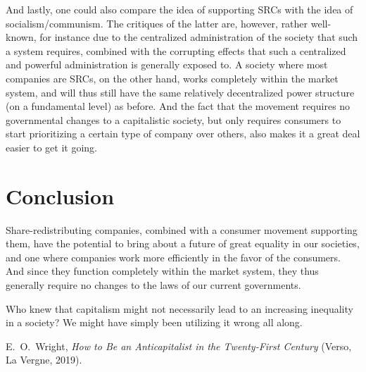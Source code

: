 \documentclass{article}
\begin{document}
And lastly, one could also compare the idea of supporting SRCs with the idea of socialism/communism. The critiques of the latter are, however, rather well-known, for instance due to the centralized administration of the society that such a system requires, combined with the corrupting effects that such a centralized and powerful administration is generally exposed to. 
A society where most companies are SRCs, on the other hand, works completely within the market system, and will thus still have the same relatively decentralized power structure (on a fundamental level) as before. And the fact that the movement requires no governmental changes to a capitalistic society, but only requires consumers to start prioritizing a certain type of company over others, also makes it a great deal easier to get it going. 




\section{Conclusion}

Share-redistributing companies, combined with a consumer movement supporting them, have the potential to bring about a future of great equality in our societies, and one where companies work more efficiently in the favor of the consumers. And since they function completely within the market system, they thus generally require no changes to the laws of our current governments. 

Who knew that capitalism might not necessarily lead to an increasing inequality in a society? We might have simply been utilizing it wrong all along.













\begin{thebibliography}{20}
	
	
	E.\ O.\ Wright, 
	\textit{ How to Be an Anticapitalist in the Twenty-First Century} 
	(Verso, La Vergne, 2019).
	
	
	
	
\end{thebibliography}
\end{document}

